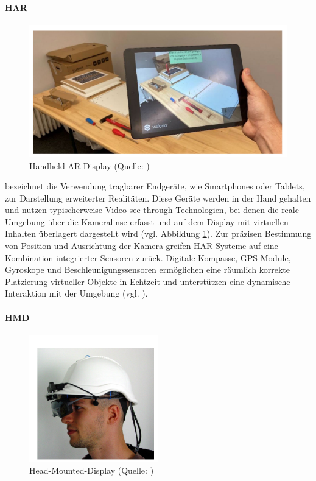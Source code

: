 \paragraph{\ac{HAR}}

\begin{figure}[ht]
\centering
\includegraphics[width=0.5\linewidth]{content/pictures/handheld-ar.PNG}
\caption{Handheld-AR Display (Quelle: \citealp[S. 318]{leins_comparing_2024})}
\label{fig:handheld-ar}
\end{figure}

bezeichnet die Verwendung tragbarer Endgeräte, wie Smartphones oder Tablets, zur Darstellung erweiterter Realitäten. Diese Geräte werden in der Hand gehalten und nutzen typischerweise Video-see-through-Technologien, bei denen die reale Umgebung über die Kameralinse erfasst und auf dem Display mit virtuellen Inhalten überlagert dargestellt wird (vgl. Abbildung \ref{fig:handheld-ar}). Zur präzisen Bestimmung von Position und Ausrichtung der Kamera greifen \ac{HAR}-Systeme auf eine Kombination integrierter Sensoren zurück. Digitale Kompasse, GPS-Module, Gyroskope und Beschleunigungssensoren ermöglichen eine räumlich korrekte Platzierung virtueller Objekte in Echtzeit und unterstützen eine dynamische Interaktion mit der Umgebung (vgl. \citealp[S. 347]{carmigniani_augmented_2011}).

\paragraph{\ac{HMD}}

\begin{figure}[ht]
\centering
\includegraphics[width=0.5\linewidth]{content/pictures/hmd-ar.PNG}
\caption{Head-Mounted-Display (Quelle: \citealp[S. 4]{reitmayr_location_2003})}
\label{fig:hmd-ar}
\end{figure}

